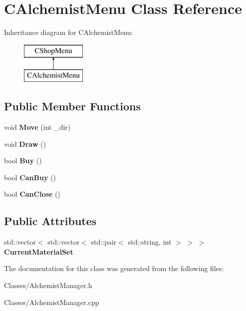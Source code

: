 \hypertarget{class_c_alchemist_menu}{}\section{C\+Alchemist\+Menu Class Reference}
\label{class_c_alchemist_menu}
Inheritance diagram for C\+Alchemist\+Menu\+:\begin{figure}[H]
\begin{center}
\leavevmode
\includegraphics[height=2.000000cm]{class_c_alchemist_menu}
\end{center}
\end{figure}
\subsection*{Public Member Functions}
\begin{DoxyCompactItemize}
\item 
void {\bfseries Move} (int \+\_\+dir)\hypertarget{class_c_alchemist_menu_a93fdf7794b5ada5a88e9a78307419fa7}{}\label{class_c_alchemist_menu_a93fdf7794b5ada5a88e9a78307419fa7}

\item 
void {\bfseries Draw} ()\hypertarget{class_c_alchemist_menu_af7990a61a6007de3e3631a6ad868b7de}{}\label{class_c_alchemist_menu_af7990a61a6007de3e3631a6ad868b7de}

\item 
bool {\bfseries Buy} ()\hypertarget{class_c_alchemist_menu_a793f7b3eb8fa9d5e9bb1fad8e13bdf5f}{}\label{class_c_alchemist_menu_a793f7b3eb8fa9d5e9bb1fad8e13bdf5f}

\item 
bool {\bfseries Can\+Buy} ()\hypertarget{class_c_alchemist_menu_a1e7d49e982e9e557eeee946623dd902f}{}\label{class_c_alchemist_menu_a1e7d49e982e9e557eeee946623dd902f}

\item 
bool {\bfseries Can\+Close} ()\hypertarget{class_c_alchemist_menu_a47036666854ac5a10f91369e2bf8854f}{}\label{class_c_alchemist_menu_a47036666854ac5a10f91369e2bf8854f}

\end{DoxyCompactItemize}
\subsection*{Public Attributes}
\begin{DoxyCompactItemize}
\item 
std\+::vector$<$ std\+::vector$<$ std\+::pair$<$ std\+::string, int $>$ $>$ $>$ {\bfseries Current\+Material\+Set}\hypertarget{class_c_alchemist_menu_a92fb036a6e2961874aa7337b94f04d67}{}\label{class_c_alchemist_menu_a92fb036a6e2961874aa7337b94f04d67}

\end{DoxyCompactItemize}


The documentation for this class was generated from the following files\+:\begin{DoxyCompactItemize}
\item 
Classes/Alchemist\+Manager.\+h\item 
Classes/Alchemist\+Manager.\+cpp\end{DoxyCompactItemize}
